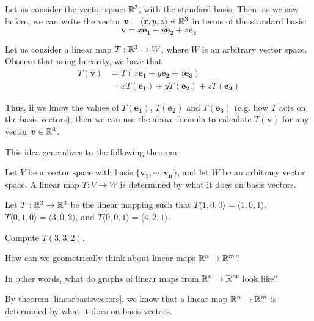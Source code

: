     \begin{example}
    Let us consider the vector space $\mathbb{R}^3$, with the standard basis.  Then, as we saw before, we can write the vector $\bm{v} = \langle x, y,z \rangle \in \mathbb{R}^3$ in terms of the standard basis:
    $$\bm{v} = x\bm{e_1} + y\bm{e_2} + z\bm{e_3}$$
    
    Let us consider a linear map $T : \mathbb{R}^3 \to W$, where $W$ is an arbitrary vector space.  Observe that using linearity, we have that
    \begin{align*}
        T(\bm{v}) &= T(x\bm{e_1} + y\bm{e_2} + z\bm{e_3}) \\
        &= xT(\bm{e_1}) + yT(\bm{e_2}) + zT(\bm{e_3})
    \end{align*}
    
    Thus, if we know the values of $T(\bm{e_1})$, $T(\bm{e_2})$ and $T(\bm{e_3})$ (e.g. how $T$ acts on the basis vectors), then we can use the above formula to calculate $T(\bm{v})$ for any vector $\bm{v} \in \mathbb{R}^3$.  
    
    \end{example}

    This idea generalizes to the following theorem:
    
    \begin{theorem}\label{linearbasisvectors}
    Let $V$ be a vector space with basis $\{\bm{v_1}, \cdots, \bm{v_n}\}$, and let $W$ be an arbitrary vector space.  A linear map $T: V \to W$ is determined by what it does on basis vectors.
    \end{theorem}

    \begin{example}
    Let $T : \mathbb{R}^3 \to \mathbb{R}^3$ be the linear mapping such that $T\langle1,0,0\rangle = \langle1,0,1\rangle$, $T\langle0,1,0\rangle = \langle3,0,2\rangle$, and $T\langle0,0,1\rangle = \langle4,2,1\rangle$. 
    
    Compute $T(3, 3, 2)$.
    \end{example}

\begin{motivating}
How can we geometrically think about linear maps $\mathbb{R}^n \to \mathbb{R}^m$?
\end{motivating}

In other words, what do graphs of linear maps from $\mathbb{R}^n \to \mathbb{R}^m$ look like?

By theorem \ref{linearbasisvectors}, we know that a linear map $\mathbb{R}^n \to \mathbb{R}^m$ is determined by what it does on basis vectors.  





